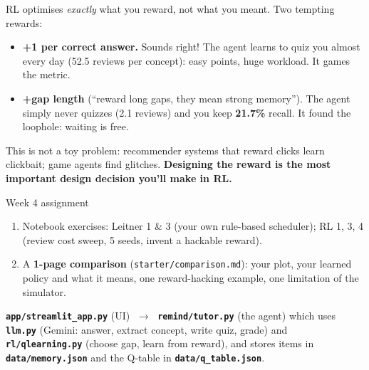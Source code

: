 RL optimises \emph{exactly} what you reward, not what you meant. Two tempting rewards:
\begin{itemize}
  \item \textbf{+1 per correct answer.} Sounds right! The agent learns to quiz you almost every day
        (52.5 reviews per concept): easy points, huge workload. It games the metric.
  \item \textbf{+gap length} (``reward long gaps, they mean strong memory''). The agent simply never quizzes
        (2.1 reviews) and you keep \textbf{21.7\%} recall. It found the loophole: waiting is free.
\end{itemize}
This is not a toy problem: recommender systems that reward clicks learn clickbait; game agents find glitches.
\textbf{Designing the reward is the most important design decision you'll make in RL.}

\begin{task}{Week 4 assignment}
\begin{enumerate}[leftmargin=1.4em]
  \item Notebook exercises: Leitner 1 \& 3 (your own rule-based scheduler); RL 1, 3, 4 (review cost sweep, 5 seeds,
        invent a hackable reward).
  \item A \textbf{1-page comparison} (\texttt{starter/comparison.md}): your plot, your learned policy and what it means,
        one reward-hacking example, one limitation of the simulator.
\end{enumerate}
\end{task}


\begin{note}
\textbf{\texttt{app/streamlit\_app.py}} (UI) $\;\rightarrow\;$ \textbf{\texttt{remind/tutor.py}} (the agent) which uses
\textbf{\texttt{llm.py}} (Gemini: answer, extract concept, write quiz, grade) and
\textbf{\texttt{rl/qlearning.py}} (choose gap, learn from reward), and stores items in \textbf{\texttt{data/memory.json}}
and the Q-table in \textbf{\texttt{data/q\_table.json}}.
\end{note}
